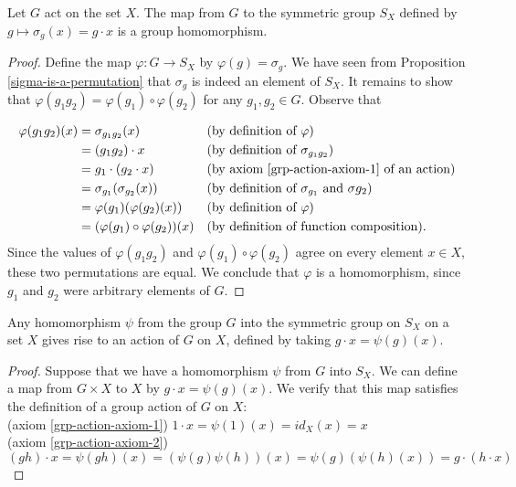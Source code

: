 \begin{prop}\label{action-yields-hom}
Let $G$ act on the set $X$. The map from $G$ to the symmetric group $S_X$ defined by $g \mapsto \sigma_g (x) = g \cdot x$ is a group homomorphism.
\end{prop}
\begin{proof}
Define the map $\varphi \colon G \to S_X$ by $\varphi (g) = \sigma_g$.  We have seen from Proposition \ref{sigma-is-a-permutation} that $\sigma_g$ is indeed an element of $S_X$.  It remains to show that $\varphi(g_1 g_2) = \varphi(g_1) \circ \varphi(g_2)$ for any $g_1, g_2 \in G$.  Observe that

\begin{align*}
\varphi(g_1 g_2)(x) &= \sigma_{g_1 g_2} (x) && \text{(by definition of $\varphi$)} \\
			&= (g_1 g_2) \cdot x && \text{(by definition of $\sigma_{g_1 g_2}$)} \\
			&= g_1 \cdot (g_2 \cdot x) && \text{(by axiom \ref{grp-action-axiom-1} of an action)} \\
			&= \sigma_{g_1} ( \sigma_{g_2} (x)) && \text{(by definition of $\sigma_{g_1}$ and  $\sigma{g_2}$)} \\
			&= \varphi(g_1) ( \varphi(g_2) (x)) && \text{(by definition of $\varphi$)}\\
			&= (\varphi(g_1) \circ \varphi(g_2)) (x) && \text{(by definition of function composition)}.
\end{align*}
Since the values of $\varphi(g_1 g_2)$ and $\varphi(g_1) \circ \varphi(g_2)$ agree on every element $x \in X$, these two permutations are equal. We conclude that $\varphi$ is a homomorphism, since $g_1$ and $g_2$ were arbitrary elements of $G$.
\end{proof}


\begin{prop} \label{hom-yields-action}
Any homomorphism $\psi$ from the group $G$ into the symmetric group on $S_X$ on a set $X$ gives rise to an action of $G$ on $X$, defined by taking $g \cdot x = \psi(g)(x)$.
\end{prop}
\begin{proof}
Suppose  that we have a homomorphism $\psi$ from $G$ into $S_X$.  We can define a map from $G \times X$ to $X$  by $g \cdot x = \psi(g)(x)$. We verify that this map satisfies the definition of a group action of $G$ on $X$:
\\ (axiom \ref{grp-action-axiom-1}) \quad $1 \cdot x = \psi(1)(x) = id_X(x) = x$
\\(axiom \ref{grp-action-axiom-2}) \quad $(gh) \cdot x = \psi(gh)(x) = (\psi(g)\psi(h))(x) = \psi(g)(\psi(h)(x)) = g \cdot (h \cdot x)$
\end{proof}

